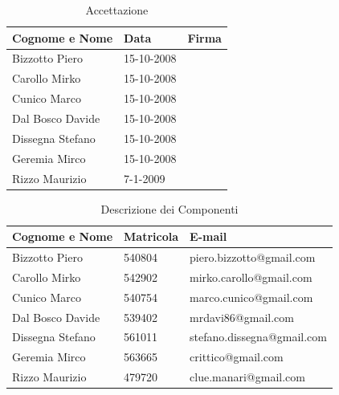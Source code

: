 \begin{table}[h]
	\begin{center}
		  \begin{tabular}{|p{}|l|p{}|}
		 \hline 
		 \textbf{Cognome e Nome} & \textbf{Data} & \textbf{Firma}\\
		 \hline
		Bizzotto Piero & 15-10-2008 & \\
		\hline
		Carollo Mirko & 15-10-2008 & \\
		\hline
		Cunico Marco & 15-10-2008 & \\
		\hline
		Dal Bosco Davide & 15-10-2008 & \\
		\hline
		Dissegna Stefano & 15-10-2008 & \\
		\hline
		Geremia Mirco & 15-10-2008 & \\
		\hline
		Rizzo Maurizio & 7-1-2009 & \\
		\hline
		\end{tabular}
	\caption{Accettazione} 
	\label{tabella_accettazione}
	\end{center}	
\end{table}

\newpage


\begin{table}[h]
	\begin{center}
		  \begin{tabular}{|p{}|l|l|}
		 \hline 
		 \textbf{Cognome e Nome} & \textbf{Matricola} & \textbf{E-mail}\\
		 \hline
		Bizzotto Piero & 540804 & piero.bizzotto@gmail.com \\
		\hline
		Carollo Mirko & 542902 & mirko.carollo@gmail.com\\
		\hline
		Cunico Marco & 540754 & marco.cunico@gmail.com\\
		\hline
		Dal Bosco Davide & 539402 & mrdavi86@gmail.com\\
		\hline
		Dissegna Stefano & 561011 & stefano.dissegna@gmail.com \\
		\hline
		Geremia Mirco & 563665 & crittico@gmail.com\\
		\hline
		Rizzo Maurizio & 479720 & clue.manari@gmail.com\\
		\hline
		\end{tabular}
	\caption{Descrizione dei Componenti} 
	\label{tab:tabella_componenti}
	\end{center}	
\end{table}


